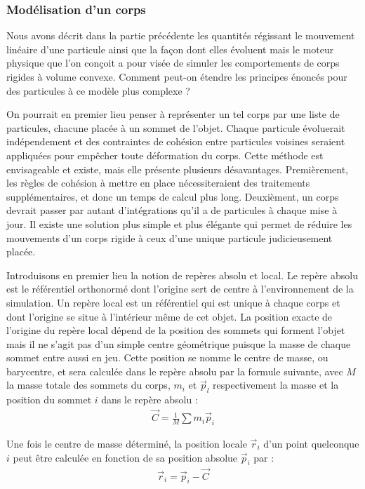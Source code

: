 \subsubsection{Modélisation d'un corps}

Nous avons décrit dans la partie précédente les quantités régissant le
mouvement linéaire d'une particule ainsi que la façon dont elles
évoluent mais le moteur physique que l'on conçoit a pour visée de
simuler les comportements de corps rigides à volume convexe. Comment
peut-on étendre les principes énoncés pour des particules à ce modèle
plus complexe ?

On pourrait en premier lieu penser à représenter un tel corps par une
liste de particules, chacune placée à un sommet de l'objet. Chaque
particule évoluerait indépendement et des contraintes de cohésion
entre particules voisines seraient appliquées pour empêcher toute
déformation du corps. Cette méthode est envisageable et existe, mais
elle présente plusieurs désavantages. Premièrement, les règles de
cohésion à mettre en place nécessiteraient des traitements
supplémentaires, et donc un temps de calcul plus long. Deuxièment, un
corps devrait passer par autant d'intégrations qu'il a de particules à
chaque mise à jour. Il existe une solution plus simple et plus
élégante qui permet de réduire les mouvements d'un corps rigide à ceux
d'une unique particule judicieusement placée.

Introduisons en premier lieu la notion de repères absolu et local. Le
repère absolu est le référentiel orthonormé dont l'origine sert de
centre à l'environnement de la simulation. Un repère local est un
référentiel qui est unique à chaque corps et dont l'origine se situe à
l'intérieur même de cet objet. La position exacte de l'origine du
repère local dépend de la position des sommets qui forment l'objet
mais il ne s'agit pas d'un simple centre géométrique puisque la masse
de chaque sommet entre aussi en jeu. Cette position se nomme le centre
de masse, ou barycentre, et sera calculée dans le repère absolu par la
formule suivante, avec $M$ la masse totale des sommets du corps, $m_i$
et $\vec{p}_l$ respectivement la masse et la position du sommet $i$
dans le repère absolu :
\begin{align*}
  \vec{C} = \frac{1}{M} \sum m_i \vec{p}_i
\end{align*}

Une fois le centre de masse déterminé, la position locale $\vec{r}_i$
d'un point quelconque $i$ peut être calculée en fonction de sa
position absolue $\vec{p}_i$ par :
\begin{align*}
  \vec{r}_i = \vec{p}_i - \vec{C}
\end{align*}

